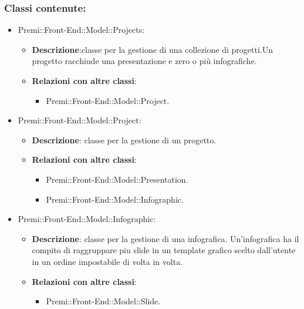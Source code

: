 	\subsubsection*{Classi contenute:}
		\begin{itemize}
			
		 \item Premi::Front-End::Model::Projects:
			\begin{itemize}
				\item \textbf{Descrizione}:classe per la gestione di una collezione di progetti.Un progetto racchiude una presentazione e zero o più infografiche.
				\item \textbf{Relazioni con altre classi}:
				\begin{itemize}
					\item Premi::Front-End::Model::Project.
				\end{itemize}
			\end{itemize}
		
		\item Premi::Front-End::Model::Project: 
			 \begin{itemize}
				\item \textbf{Descrizione}: classe per la gestione di un progetto.
				\item \textbf{Relazioni con altre classi}:
				\begin{itemize}
					\item Premi::Front-End::Model::Presentation.
					\item Premi::Front-End::Model::Infographic.
				\end{itemize}
			\end{itemize}
		
		 \item Premi::Front-End::Model::Infographic:
			\begin{itemize}
				\item \textbf{Descrizione}: classe per la gestione di una infografica. Un'infografica ha il compito di raggruppare piu slide in un template grafico scelto dall'utente in un ordine impostabile di volta in volta.
				\item \textbf{Relazioni con altre classi}:
				\begin{itemize}
					\item Premi::Front-End::Model::Slide.
				\end{itemize}
			\end{itemize}
		 

\end{itemize}

